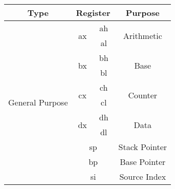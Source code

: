 \documentclass[11pt,a5paper,footinclude=true,headinclude=true]{scrbook} %
\begin{document}
\begin{center}
	\begin{tabular}{|c|c|c|c|}
		\hline
		Type                              & \multicolumn{2}{c|}{Register}            & Purpose\\\hline\hline
		\multirow{16}{*}{General Purpose} & \multirow{2}{*}{ax}                      & ah                                 & \multirow{2}{*}{Arithmetic}\\
		\cline{3-3}
		                                  &                                          & al                                 &\\
		\cline{2-4}
		                                  & \multirow{2}{*}{bx}                      & bh                                 & \multirow{2}{*}{Base}\\
		\cline{3-3}
		                                  &                                          & bl                                 &\\
		\cline{2-4}
		                                  & \multirow{2}{*}{cx}                      & ch                                 & \multirow{2}{*}{Counter}\\
		\cline{3-3}
		                                  &                                          & cl                                 &\\
		\cline{2-4}
		                                  & \multirow{2}{*}{dx}                      & dh                                 & \multirow{2}{*}{Data}\\
		\cline{3-3}
		                                  &                                          & dl                                 &\\
		\cline{2-4}
		                                  & \multicolumn{2}{c|}{\multirow{2}{*}{sp}} & \multirow{2}{*}{Stack Pointer}\\
		                                  & \multicolumn{2}{c|}{}                    &\\
		\cline{2-4}
		                                  & \multicolumn{2}{c|}{\multirow{2}{*}{bp}} & \multirow{2}{*}{Base Pointer}\\
		                                  & \multicolumn{2}{c|}{}                    &\\
		\cline{2-4}
		                                  & \multicolumn{2}{c|}{\multirow{2}{*}{si}} & \multirow{2}{*}{Source Index}\\
		                                  & \multicolumn{2}{c|}{}                    &\\

\end{tabular}
\end{center}
\end{document}

